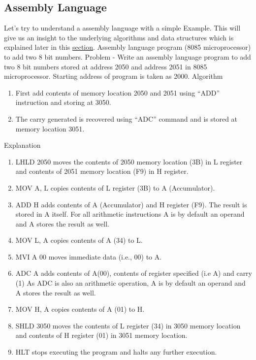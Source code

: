 \documentclass[a4paper,12pt]{extarticle}
\begin{document}
	\subsection{Assembly Language}
	Let’s try to understand a assembly language with a simple Example. This will give
	us an insight to the underlying algorithms and data structures which is explained
	later in this \hyperref[sec:assembler]{section}.
	Assembly language program (8085 microprocessor) to add two 8 bit numbers.
	Problem - Write an assembly language program to add two 8 bit numbers stored at
	address 2050 and address 2051 in 8085 microprocessor. Starting address of program
	is taken as 2000.\newline
	Algorithm
	\begin{enumerate}
		\item First add contents of memory location 2050 and 2051 using “ADD” instruction
		and storing at 3050.
		\item The carry generated is recovered using “ADC” command and is stored at memory
		location 3051.
	\end{enumerate}
	Explanation
	\begin{enumerate}
		\item LHLD 2050 moves the contents of 2050 memory location (3B) in L register
		and contents of 2051 memory location (F9) in H register.
		\item MOV A, L copies contents of L register (3B) to A (Accumulator).
		\item ADD H adds contents of A (Accumulator) and H register (F9). The result is
		stored in A itself. For all arithmetic instructions A is by default an operand
		and A stores the result as well.
		\item MOV L, A copies contents of A (34) to L.
		\item MVI A 00 moves immediate data (i.e., 00) to A.
		\item ADC A adds contents of A(00), contents of register specified (i.e A) and carry
		(1) As ADC is also an arithmetic operation, A is by default an operand and
		\newline A stores the result as well.
		\item MOV H, A copies contents of A (01) to H.
		\item SHLD 3050 moves the contents of L register (34) in 3050 memory location and
		contents of H register (01) in 3051 memory location.
		\item HLT stops executing the program and halts any further execution.
	\end{enumerate}
	
\end{document}
